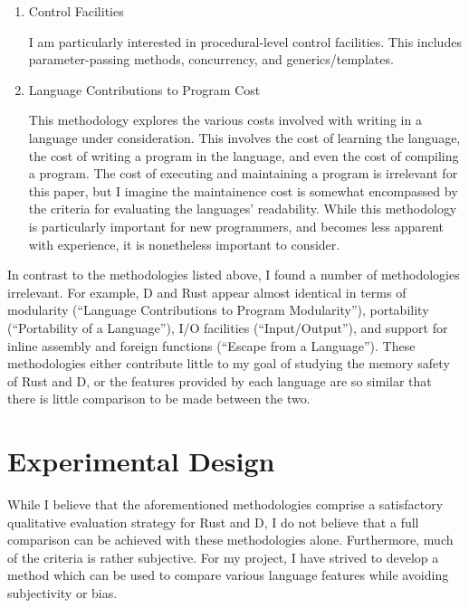 \documentclass[draftcopy,nolof,nolot]{srpaper}
\begin{document}
\begin{enumerate}
\item Control Facilities

I am particularly interested in procedural-level control facilities. This
includes parameter-passing methods, concurrency, and generics/templates.

\item Language Contributions to Program Cost

This methodology explores the various costs involved with writing in a language
under consideration. This involves the cost of learning the language, the cost
of writing a program in the language, and even the cost of compiling a program.
The cost of executing and maintaining a program is irrelevant for this paper,
but I imagine the maintainence cost is somewhat encompassed by the criteria for
evaluating the languages' readability. While this methodology is particularly
important for new programmers, and becomes less apparent with experience, it is
nonetheless important to consider.

\end{enumerate}

In contrast to the methodologies listed above, I found a number of
methodologies irrelevant. For example, D and Rust appear almost identical in
terms of modularity (``Language Contributions to Program Modularity''),
portability (``Portability of a Language''), I/O facilities (``Input/Output''),
and support for inline assembly and foreign functions (``Escape from a
Language''). These methodologies either contribute little to my goal of
studying the memory safety of Rust and D, or the features provided by each
language are so similar that there is little comparison to be made between the
two.

\section{Experimental Design}

While I believe that the aforementioned methodologies comprise a satisfactory
qualitative evaluation strategy for Rust and D, I do not believe that a full
comparison can be achieved with these methodologies alone. Furthermore, much of
the criteria is rather subjective. For my project, I have strived to develop a
method which can be used to compare various language features while avoiding
subjectivity or bias.
\end{document}
